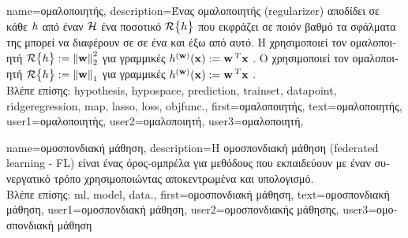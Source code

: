 {name={\foreignlanguage{greek}{ομαλοποιητής}}, 
	description={\foreignlanguage{greek}{Ένας ομαλοποιητής} (regularizer) 
		\foreignlanguage{greek}{αποδίδει σε κάθε}  $h$ \foreignlanguage{greek}{από έναν} 
		 $\mathcal{H}$ 	\foreignlanguage{greek}{ένα ποσοτικό}  
		$\mathcal{R}\big\{ h \big\}$ \foreignlanguage{greek}{που εκφράζει σε ποιόν βαθμό τα σφάλματα} 
		 \foreignlanguage{greek}{της μπορεί να διαφέρουν σε}  
		\foreignlanguage{greek}{σε ένα}  \foreignlanguage{greek}{και έξω από αυτό. Η} 
		 \foreignlanguage{greek}{χρησιμοποιεί τον ομαλοποιητή 
		$\regularizer{\hypothesis} \defeq \normgeneric{\weights}{2}^{2}$ για γραμμικές}   
		$h^{({\bf w})}({\bf x}) := {\bf w}\,^{T} {\bf x}$ \cite[\foreignlanguage{greek}{Κεφ.} 3]{MLBasics}. 
		\foreignlanguage{greek}{Ο}  \foreignlanguage{greek}{χρησιμο\-ποι\-εί τον ομαλοποιητή 
		$\regularizer{\hypothesis} \defeq \normgeneric{\weights}{1}$ για γραμμικές}   
		$h^{({\bf w})}({\bf x}) := {\bf w}\,^{T} {\bf x}$ \cite[\foreignlanguage{greek}{Κεφ.} 3]{MLBasics}.
		\\
		\foreignlanguage{greek}{Βλέπε επίσης:} \gls{hypothesis}, \gls{hypospace}, \gls{prediction}, \gls{trainset}, \gls{datapoint}, 
		\gls{ridgeregression}, \gls{map}, \gls{lasso}, \gls{loss}, \gls{objfunc}.},
	first={\foreignlanguage{greek}{ομαλοποιητής}},
	text={\foreignlanguage{greek}{ομαλοποιητής}},
	user1={\foreignlanguage{greek}{ομαλοποιητής}}, %
 	user2={\foreignlanguage{greek}{ομαλοποιητή}}, %
 	user3={\foreignlanguage{greek}{ομαλοποιητή}}, %
}

{name={\foreignlanguage{greek}{ομοσπονδιακή μάθηση}}, 
	description={\foreignlanguage{greek}{Η ομοσπονδιακή μάθηση} 
		(federated learning - FL) \foreignlanguage{greek}{είναι ένας όρος-ομπρέλα για μεθόδους}  
		\foreignlanguage{greek}{που εκπαι\-δεύ\-ουν}  \foreignlanguage{greek}{με έναν συνεργατικό
		τρόπο χρησιμοποιώντας αποκεντρωμένα}  \foreignlanguage{greek}{και υπολογισμό}.
		\\
		\foreignlanguage{greek}{Βλέπε επίσης:} \gls{ml}, \gls{model}, \gls{data}.},
	first={\foreignlanguage{greek}{ομοσπονδιακή μάθηση}},
	text={\foreignlanguage{greek}{ομοσπονδιακή μάθηση}}, 
	user1={\foreignlanguage{greek}{ομοσπονδιακή μάθηση}}, %
  	user2={\foreignlanguage{greek}{ομοσπονδιακής μάθησης}}, %
	user3={\foreignlanguage{greek}{ομοσπονδιακή μάθηση}} %
}

